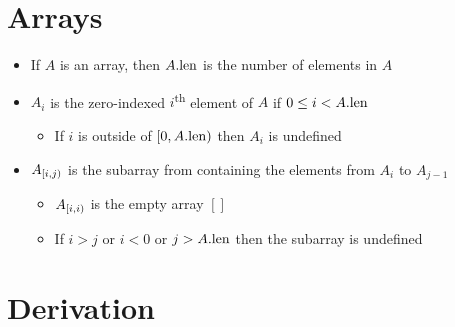 \section{Arrays}

\begin{itemize}
	
	\item If $ A $ is an array, then $ A.\text{len} $ is the number of elements in $ A $
	
	\item $ A_i $ is the zero-indexed $ i $\textsuperscript{th} element of $ A $ if $ 0 \le i < A.\text{len} $
	
	\begin{itemize}
		
		\item If $ i $ is outside of $ \left[ 0, A.\text{len} \right) $ then $ A_i $ is undefined
		
	\end{itemize}

	\item $ {A}_{\left[{i},{j}\right)} $ is the subarray from containing the elements from $ A_i $ to $ A_{j - 1} $
	
	\begin{itemize}
		
		\item $ {A}_{\left[{i},{i}\right)} $ is the empty array $ [] $
		
		\item If $ i > j $ or $ i < 0 $ or $ j > A.\text{len} $ then the subarray is undefined
		 
	\end{itemize}
	
\end{itemize}

\section{Derivation}

